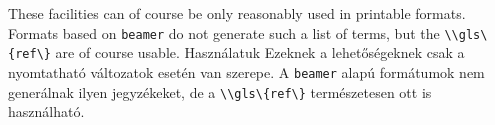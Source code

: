 
{
These facilities can of course be only reasonably used in printable formats.
Formats based on \lstinline|beamer| do not generate such a list of terms,
but the \lstinline|\\gls\{ref\}|  are of course usable.
}
{Használatuk}
{
Ezeknek a lehetőségeknek csak a nyomtatható változatok esetén van szerepe.
A \lstinline|beamer| alapú formátumok nem generálnak ilyen jegyzékeket,
de a \lstinline|\\gls\{ref\}| természetesen ott is használható.
}


